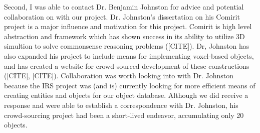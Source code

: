 Second, I was able to contact Dr. Benjamin Johnston for advice and potential collaboration on with our project. Dr. Johnston's dissertation on his Comirit project is a major influence and motivation for this project. Comirit is high level abstraction and framework which has shown success in its ability to utilize 3D simultion to solve commonsense reasoning problems ([CITE]). Dr, Johnston has also expanded his project to include means for implementing voxel-based objects, and has created a website for crowd-sourced development of these constructions ([CITE], [CITE]). Collaboration was worth looking into with Dr. Johnston because the IRS project was (and is) currently looking for more efficient means of creating entities and objects for our object database. Although we did receive a response and were able to establish a correspondence with Dr. Johnston, his crowd-sourcing project had been a short-lived endeavor, accumulating only 20 objects.
